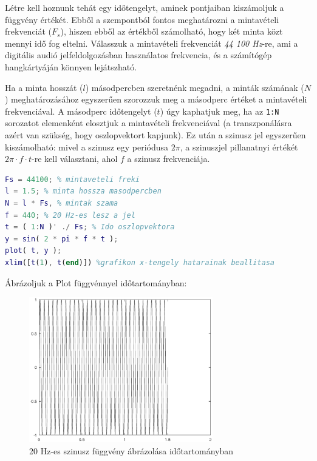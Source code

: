 \documentclass[12pt,a4paper]{article}
\begin{document}
Létre kell hoznunk tehát egy időtengelyt, aminek pontjaiban kiszámoljuk a függvény értékét. Ebből a szempontból fontos meghatározni a mintavételi frekvenciát ($F_s$), hiszen ebből az értékből számolható, hogy két minta közt mennyi idő fog eltelni. Válasszuk a mintavételi frekvenciát \textit{44 100 Hz}-re, ami a digitális audió jelfeldolgozásban használatos frekvencia, és a számítógép hangkártyáján könnyen lejátszható.

Ha a minta hosszát ($l$) másodpercben szeretnénk megadni, a minták számának ($N$) meghatározásához egyszerűen szorozzuk meg a másodperc értéket a mintavételi frekvenciával. A másodperc időtengelyt ($t$) úgy kaphatjuk meg, ha az \texttt{1:N} sorozatot elemenként elosztjuk a mintavételi frekvenciával (a transzponálásra azért van szükség, hogy oszlopvektort kapjunk). Ez után a szinusz jel egyszerűen kiszámolható: mivel a szinusz egy periódusa $2\pi$, a szinuszjel pillanatnyi értékét $2\pi \cdot f \cdot t$-re kell választani, ahol $f$ a szinusz frekvenciája.

\begin{lstlisting}[frame=single,language=matlab,caption=Mintavételi frekvencia beállítása és szinuszjel előállítása]
Fs = 44100; % mintaveteli freki
l = 1.5; % minta hossza masodpercben
N = l * Fs, % mintak szama
f = 440; % 20 Hz-es lesz a jel
t = ( 1:N )' ./ Fs; % Ido oszlopvektora
y = sin( 2 * pi * f * t );
plot( t, y );
xlim([t(1), t(end)]) %grafikon x-tengely hatarainak beallitasa
\end{lstlisting}

\clearpage
Ábrázoljuk a Plot függvénnyel időtartományban:

\begin{figure}[H]
\begin{center}
\includegraphics[width=8cm]{figures/modulaciok_workshop_szinusz.eps}
\caption{20 Hz-es szinusz függvény ábrázolása időtartományban}
\label{fig:szinusz}
\end{center}
\end{figure}
\end{document}
